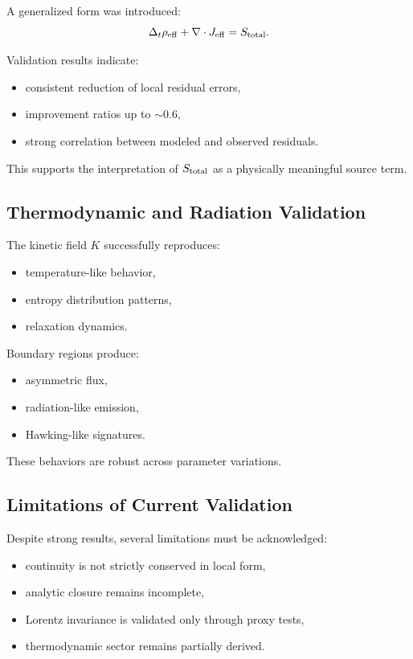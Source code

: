 \documentclass[11pt]{article}
\begin{document}
A generalized form was introduced:
\begin{equation}
\Delta_t \rho_{\rm eff} + \nabla \cdot J_{\rm eff} = S_{\rm total}.
\end{equation}

Validation results indicate:

\begin{itemize}
\item consistent reduction of local residual errors,
\item improvement ratios up to $\sim 0.6$,
\item strong correlation between modeled and observed residuals.
\end{itemize}

This supports the interpretation of $S_{\rm total}$ as a physically meaningful source term.

\subsection{Thermodynamic and Radiation Validation}

The kinetic field $K$ successfully reproduces:

\begin{itemize}
\item temperature-like behavior,
\item entropy distribution patterns,
\item relaxation dynamics.
\end{itemize}

Boundary regions produce:

\begin{itemize}
\item asymmetric flux,
\item radiation-like emission,
\item Hawking-like signatures.
\end{itemize}

These behaviors are robust across parameter variations.

\subsection{Limitations of Current Validation}

Despite strong results, several limitations must be acknowledged:

\begin{itemize}
\item continuity is not strictly conserved in local form,
\item analytic closure remains incomplete,
\item Lorentz invariance is validated only through proxy tests,
\item thermodynamic sector remains partially derived.
\end{itemize}
\end{document}
